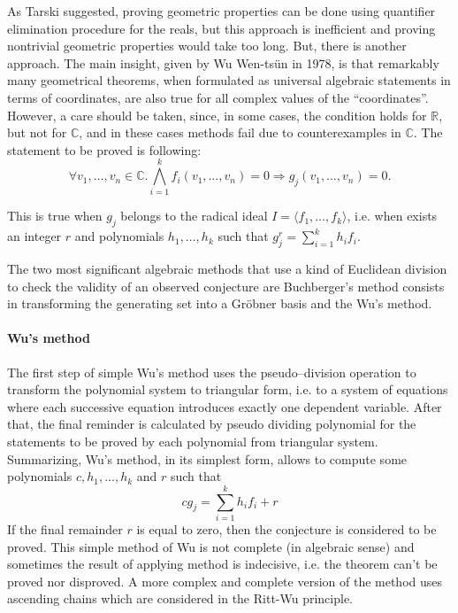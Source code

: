 \documentclass[final,1p,times,authoryear]{elsarticle}
\begin{document}
As Tarski suggested, proving geometric properties can be done using
quantifier elimination procedure for the reals, but this approach is
inefficient and proving nontrivial geometric properties would take too
long. But, there is another approach. The main insight, given by Wu
Wen-ts\"un in 1978, is that remarkably many geometrical theorems, when
formulated as universal algebraic statements in terms of coordinates,
are also true for all complex values of the “coordinates”. However, a
care should be taken, since, in some cases, the condition holds for
$\mathbb{R}$, but not for $\mathbb{C}$, and in these cases methods
fail due to counterexamples in $\mathbb{C}$. The statement to be
proved is following:
$$\forall v_1, \ldots, v_n \in \mathbb{C}. \bigwedge_{i = 1}^{k} f_i(v_1, \ldots, v_n) = 0 \Longrightarrow g_j(v_1, \ldots, v_n) = 0.$$

This is true when $g_j$ belongs to the radical ideal $I = \langle f_1,
\ldots, f_k \rangle$, i.e. when exists an integer $r$ and polynomials
$h_1, \ldots, h_k$ such that $g_j^r = \sum_{i=1}^k h_if_i$.

The two most significant algebraic methods that use a kind of
Euclidean division to check the validity of an observed conjecture are
Buchberger's method consists in transforming the generating set into a
Gr\"obner basis and the Wu's method.

\paragraph{Wu's method}

The first step of simple Wu's method \cite{wu} uses the
pseudo--division operation to transform the polynomial system to
triangular form, i.e. to a system of equations where each successive
equation introduces exactly one dependent variable. After that, the
final reminder is calculated by pseudo dividing polynomial for the
statements to be proved by each polynomial from triangular system.
Summarizing, Wu's method, in its simplest form, allows to compute some
polynomials $c, h_1, \ldots, h_k$ and $r$ such that
$$cg_j = \sum_{i=1}^{k}h_if_i + r$$ If the final remainder $r$ is
equal to zero, then the conjecture is considered to be proved. This
simple method of Wu is not complete (in algebraic sense) and
sometimes the result of applying method is indecisive, i.e. the
theorem can't be proved nor disproved. A more complex and complete
version of the method uses ascending chains which are considered in
the Ritt-Wu principle.
\end{document}
